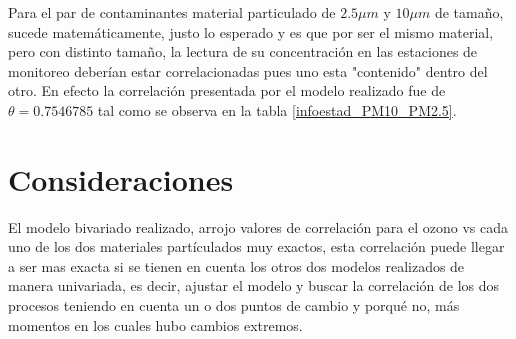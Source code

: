 Para el par de contaminantes material particulado de $2.5 \mu m$ y $10 \mu m$ de tamaño, sucede matemáticamente, justo lo esperado y es que por ser el mismo material, pero con distinto tamaño, la lectura de su concentración en las estaciones de monitoreo deberían estar correlacionadas pues uno esta "contenido" dentro del otro. En efecto la correlación presentada por el modelo realizado fue de $\theta=0.7546785$ tal como se observa en la tabla \ref{infoestad_PM10_PM2.5}. 


\section{Consideraciones}

El modelo bivariado realizado, arrojo valores de correlación para el ozono vs cada uno de los dos materiales partículados muy exactos, esta correlación puede llegar a ser mas exacta si se tienen en cuenta los otros dos modelos realizados de manera univariada, es decir, ajustar el modelo y buscar la correlación de los dos procesos teniendo en cuenta un o dos puntos de cambio y porqué no, más momentos en los cuales hubo cambios extremos. 